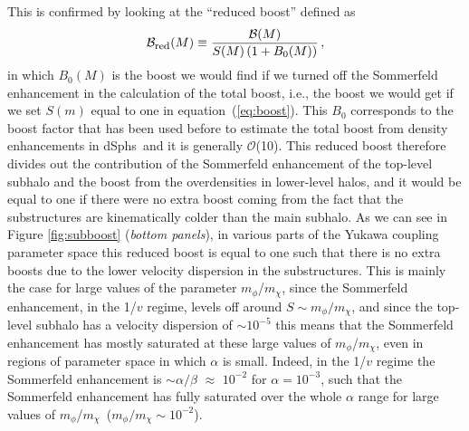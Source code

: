 \documentclass[aps,prd,twocolumn,amsmath,amssymb,floatfix,nofootinbib,10pt]{revtex4}
\newcommand{\ie}{i.e.}
\newcommand{\somm}{\ensuremath{S}}
\newcommand{\mdm}{\ensuremath{m_{\chi}}}
\newcommand{\mv}{\ensuremath{m_{\phi}}}
\newcommand{\eqnname}{equation}
\newcommand{\order}{\ensuremath{\mathcal{O}}}
\newcommand{\boost}{\ensuremath{B}}
\newcommand{\redboost}{\ensuremath{\mathcal{B}_{\mbox{{\footnotesize red}}}}}
\newcommand{\totalboost}{\ensuremath{\mathcal{B}}}
\newcommand{\dSphs}{dSphs}
\begin{document}
This is confirmed by looking at the ``reduced boost'' defined as
\begin{equation}\label{eq:redboost}
\redboost(M) \equiv \frac{\totalboost(M)}{\somm(M)\left(1+\boost_0(M)\right)}\, ,
\end{equation}
in which $\boost_0(M)$ is the boost we would find if we turned off the
Sommerfeld enhancement in the calculation of the total boost, \ie, the
boost we would get if we set $\somm(m)$ equal to one in \eqnname\
(\ref{eq:boost}). This $\boost_0$ corresponds to the boost factor that
has been used before to estimate the total boost from density
enhancements in \dSphs\ and it is generally \order(10). This reduced
boost therefore divides out the contribution of the Sommerfeld
enhancement of the top-level subhalo and the boost from the
overdensities in lower-level halos, and it would be equal to one if
there were no extra boost coming from the fact that the substructures
are kinematically colder than the main subhalo. As we can see in
Figure \ref{fig:subboost} (\emph{bottom panels}), in various parts of
the Yukawa coupling parameter space this reduced boost is equal to one
such that there is no extra boosts due to the lower velocity
dispersion in the substructures. This is mainly the case for large
values of the parameter \mv/\mdm, since the Sommerfeld enhancement, in
the 1/$v$ regime, levels off around $\somm \sim \mv/\mdm$, and since
the top-level subhalo has a velocity dispersion of $\sim 10^{-5}$ this
means that the Sommerfeld enhancement has mostly saturated at these
large values of \mv/\mdm, even in regions of parameter space in which
$\alpha$ is small. Indeed, in the 1/$v$ regime the Sommerfeld
enhancement is $\sim \alpha/\beta$ $\approx$ $10^{-2}$ for $\alpha =
10^{-3}$, such that the Sommerfeld enhancement has fully saturated
over the whole $\alpha$ range for large values of \mv/\mdm\ ($\mv/\mdm
\sim 10^{-2}$).
\end{document}
